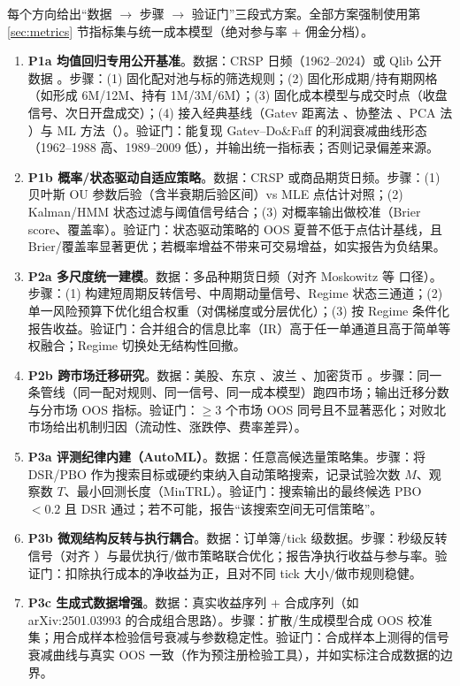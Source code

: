 每个方向给出“数据 $\to$ 步骤 $\to$ 验证门”三段式方案。全部方案强制使用第 \ref{sec:metrics} 节指标集与统一成本模型（绝对参与率 + 佣金分档）。

\begin{enumerate}
  \item \textbf{P1a 均值回归专用公开基准}。数据：CRSP 日频（1962--2024）或 Qlib 公开数据 \cite{qlib}。步骤：(1) 固化配对池与标的筛选规则；(2) 固化形成期/持有期网格（如形成 6M/12M、持有 1M/3M/6M）；(3) 固化成本模型与成交时点（收盘信号、次日开盘成交）；(4) 接入经典基线（Gatev 距离法 \cite{gatev2006}、协整法 \cite{englegranger1987}、PCA 法 \cite{avellaneda2010}）与 ML 方法（\cite{arxiv_dl_sa,arxiv_rl_sa}）。验证门：能复现 Gatev--Do\&Faff 的利润衰减曲线形态（1962--1988 高、1989--2009 低），并输出统一指标表；否则记录偏差来源。
  \item \textbf{P1b 概率/状态驱动自适应策略}。数据：CRSP 或商品期货日频。步骤：(1) 贝叶斯 OU 参数后验（含半衰期后验区间）vs MLE 点估计对照；(2) Kalman/HMM 状态过滤与阈值信号结合；(3) 对概率输出做校准（Brier score、覆盖率）。验证门：状态驱动策略的 OOS 夏普不低于点估计基线，且 Brier/覆盖率显著更优；若概率增益不带来可交易增益，如实报告为负结果。
  \item \textbf{P2a 多尺度统一建模}。数据：多品种期货日频（对齐 Moskowitz 等 \cite{mom2012} 口径）。步骤：(1) 构建短周期反转信号、中周期动量信号、Regime 状态三通道；(2) 单一风险预算下优化组合权重（对偶梯度或分层优化）；(3) 按 Regime 条件化报告收益。验证门：合并组合的信息比率（IR）高于任一单通道且高于简单等权融合；Regime 切换处无结构性回撤。
  \item \textbf{P2b 跨市场迁移研究}。数据：美股、东京 \cite{arxiv_tse}、波兰 \cite{arxiv_poland_sa}、加密货币 \cite{arxiv_crypto_coint,arxiv_crypto_drl}。步骤：同一条管线（同一配对规则、同一信号、同一成本模型）跑四市场；输出迁移分数与分市场 OOS 指标。验证门：$\geq 3$ 个市场 OOS 同号且不显著恶化；对败北市场给出机制归因（流动性、涨跌停、费率差异）。
  \item \textbf{P3a 评测纪律内建（AutoML）}。数据：任意高候选量策略集。步骤：将 DSR/PBO 作为搜索目标或硬约束纳入自动策略搜索，记录试验次数 $M$、观察数 $T$、最小回测长度（MinTRL）。验证门：搜索输出的最终候选 PBO $<0.2$ 且 DSR 通过；若不可能，报告“该搜索空间无可信策略”。
  \item \textbf{P3b 微观结构反转与执行耦合}。数据：订单簿/tick 级数据。步骤：秒级反转信号（对齐 \cite{arxiv_microstructure}）与最优执行/做市策略联合优化；报告净执行收益与参与率。验证门：扣除执行成本的净收益为正，且对不同 tick 大小/做市规则稳健。
  \item \textbf{P3c 生成式数据增强}。数据：真实收益序列 + 合成序列（如 arXiv:2501.03993 的合成组合思路）。步骤：扩散/生成模型合成 OOS 校准集；用合成样本检验信号衰减与参数稳定性。验证门：合成样本上测得的信号衰减曲线与真实 OOS 一致（作为预注册检验工具），并如实标注合成数据的边界。
\end{enumerate}

